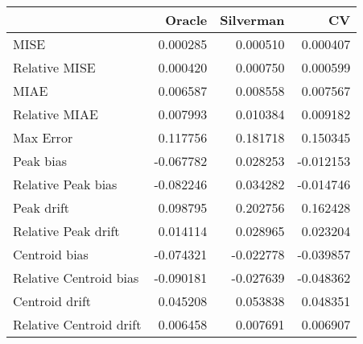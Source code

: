 \begin{tabular}{lrrr}
  \hline
 & Oracle & Silverman & CV \\ 
  \hline
MISE & 0.000285 & 0.000510 & 0.000407 \\ 
  Relative MISE & 0.000420 & 0.000750 & 0.000599 \\ 
  MIAE & 0.006587 & 0.008558 & 0.007567 \\ 
  Relative MIAE & 0.007993 & 0.010384 & 0.009182 \\ 
  Max Error & 0.117756 & 0.181718 & 0.150345 \\ 
  Peak bias & -0.067782 & 0.028253 & -0.012153 \\ 
  Relative Peak bias & -0.082246 & 0.034282 & -0.014746 \\ 
  Peak drift & 0.098795 & 0.202756 & 0.162428 \\ 
  Relative Peak drift & 0.014114 & 0.028965 & 0.023204 \\ 
  Centroid bias & -0.074321 & -0.022778 & -0.039857 \\ 
  Relative Centroid bias & -0.090181 & -0.027639 & -0.048362 \\ 
  Centroid drift & 0.045208 & 0.053838 & 0.048351 \\ 
  Relative Centroid drift & 0.006458 & 0.007691 & 0.006907 \\ 
   \hline
\end{tabular}
